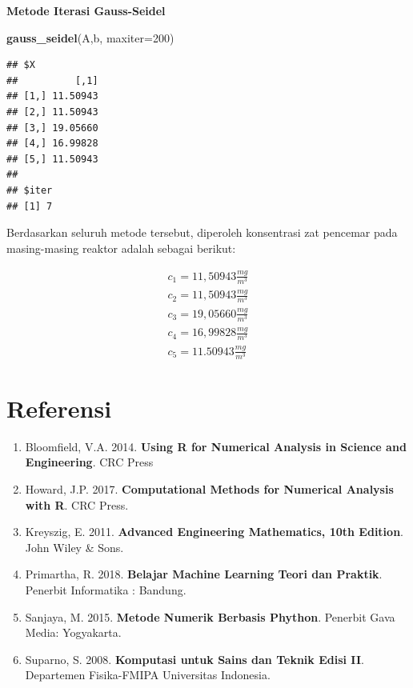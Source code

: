 \documentclass[]{book}
\newenvironment{Shaded}{\begin{snugshade}}{\end{snugshade}}
\newcommand{\DataTypeTok}[1]{\textcolor[rgb]{0.13,0.29,0.53}{#1}}
\newcommand{\DecValTok}[1]{\textcolor[rgb]{0.00,0.00,0.81}{#1}}
\newcommand{\KeywordTok}[1]{\textcolor[rgb]{0.13,0.29,0.53}{\textbf{#1}}}
\newcommand{\NormalTok}[1]{#1}
\providecommand{\tightlist}{%
  \setlength{\itemsep}{0pt}\setlength{\parskip}{0pt}}
\theoremstyle{definition}
\theoremstyle{definition}
\theoremstyle{definition}
\theoremstyle{remark}
\begin{document}
\textbf{Metode Iterasi Gauss-Seidel}

\begin{Shaded}
\begin{Highlighting}[]
\KeywordTok{gauss_seidel}\NormalTok{(A,b, }\DataTypeTok{maxiter=}\DecValTok{200}\NormalTok{)}
\end{Highlighting}
\end{Shaded}

\begin{verbatim}
## $X
##          [,1]
## [1,] 11.50943
## [2,] 11.50943
## [3,] 19.05660
## [4,] 16.99828
## [5,] 11.50943
## 
## $iter
## [1] 7
\end{verbatim}

Berdasarkan seluruh metode tersebut, diperoleh konsentrasi zat pencemar pada masing-masing reaktor adalah sebagai berikut:

\[
\begin{matrix}
  c_{1}=11,50943 \frac{mg}{m^3} \\
  c_{2}=11,50943 \frac{mg}{m^3} \\
  c_{3}=19,05660 \frac{mg}{m^3} \\
  c_{4}=16,99828 \frac{mg}{m^3} \\
  c_{5}=11.50943 \frac{mg}{m^3}
\end{matrix}
\]

\hypertarget{referensi-5}{%
\section{Referensi}\label{referensi-5}}

\begin{enumerate}
\def\labelenumi{\arabic{enumi}.}
\tightlist
\item
  Bloomfield, V.A. 2014. \textbf{Using R for Numerical Analysis in Science and Engineering}. CRC Press
\item
  Howard, J.P. 2017. \textbf{Computational Methods for Numerical Analysis with R}. CRC Press.
\item
  Kreyszig, E. 2011. \textbf{Advanced Engineering Mathematics, 10th Edition}. John Wiley \& Sons.
\item
  Primartha, R. 2018. \textbf{Belajar Machine Learning Teori dan Praktik}. Penerbit Informatika : Bandung.
\item
  Sanjaya, M. 2015. \textbf{Metode Numerik Berbasis Phython}. Penerbit Gava Media: Yogyakarta.
\item
  Suparno, S. 2008. \textbf{Komputasi untuk Sains dan Teknik Edisi II}. Departemen Fisika-FMIPA Universitas Indonesia.
\end{enumerate}
\end{document}
